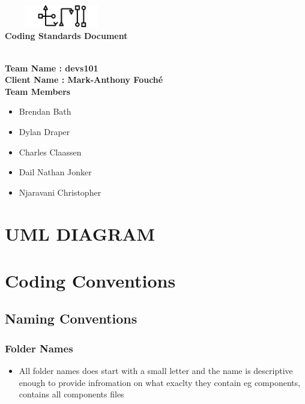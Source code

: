\documentclass[12pt]{article}
\begin{document}
{\centering
	\includegraphics[width=5cm, height=1cm]{cos301logofinal.jpg}\\ 
	\textbf{Coding Standards Document}
	
	\noindent\makebox[\linewidth]{\rule{\paperwidth}{0.4pt}}\\ 
	\vspace*{100px}
	\textbf{Team Name : devs101} \\
	\textbf{Client Name : Mark-Anthony Fouché}\\
		\vspace*{10px}
	\textbf{Team Members}\\
		\vspace*{3px}
		\begin{center}
      	\begin{itemize}
      	
      	\item Brendan Bath
      	\item Dylan Draper
      	\item Charles Claassen
      		\item Dail Nathan Jonker
      	\item Njaravani Christopher
        \end{itemize}
     \end{center}
     
     }
     \newpage
      \section{UML DIAGRAM }
     \section{Coding Conventions}
     \subsection{Naming Conventions}
     
     \subsubsection{Folder Names}
     \begin{itemize}
      	\item All folder names does start with a small letter and the name is descriptive enough to provide infromation on what exaclty they contain eg components, contains all components files
      	\end{itemize}
\end{document}
